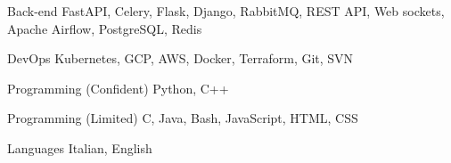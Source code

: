 

\begin{cvskills}

  \cvskill
    {Back-end} %
    {FastAPI, Celery, Flask, Django, RabbitMQ, REST API, Web sockets, Apache Airflow, PostgreSQL, Redis} %

  \cvskill
    {DevOps} %
    {Kubernetes, GCP, AWS, Docker, Terraform, Git, SVN} %


  \cvskill
    {Programming (Confident)} %
    {Python, C++} %
  
  \cvskill
    {Programming (Limited)} %
    {C, Java, Bash, JavaScript, HTML, CSS} %

  \cvskill
    {Languages} %
    {Italian, English} %

\end{cvskills}
